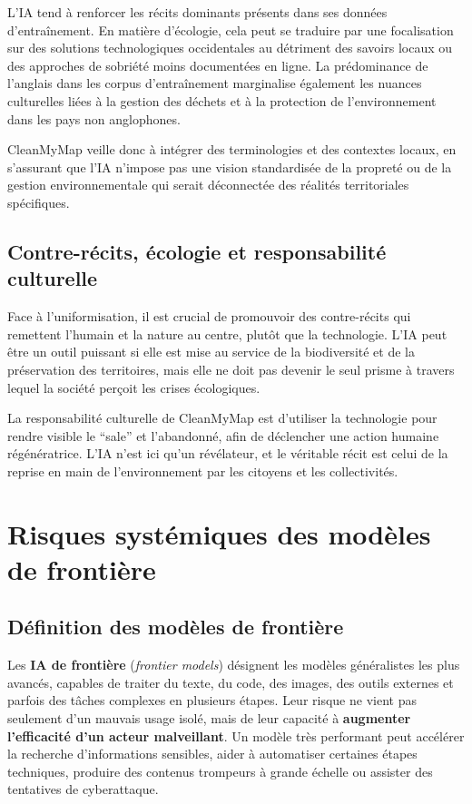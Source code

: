 \documentclass[
  10pt,
  a4paper,
  DIV=11,
  numbers=noendperiod,
  oneside]{scrreprt}
\let\oldtextbf\textbf
\renewcommand{\textbf}[1]{\oldtextbf{\textcolor{cmmnavy}{#1}}}
\let\oldemph\emph
\renewcommand{\emph}[1]{\oldemph{\textcolor{cmmgray}{#1}}}
\begin{document}
L'IA tend à renforcer les récits dominants présents dans ses données
d'entraînement. En matière d'écologie, cela peut se traduire par une
focalisation sur des solutions technologiques occidentales au détriment
des savoirs locaux ou des approches de sobriété moins documentées en
ligne. La prédominance de l'anglais dans les corpus d'entraînement
marginalise également les nuances culturelles liées à la gestion des
déchets et à la protection de l'environnement dans les pays non
anglophones.

CleanMyMap veille donc à intégrer des terminologies et des contextes
locaux, en s'assurant que l'IA n'impose pas une vision standardisée de
la propreté ou de la gestion environnementale qui serait déconnectée des
réalités territoriales spécifiques.

\subsection{Contre-récits, écologie et responsabilité
culturelle}\label{contre-ruxe9cits-uxe9cologie-et-responsabilituxe9-culturelle}

Face à l'uniformisation, il est crucial de promouvoir des contre-récits
qui remettent l'humain et la nature au centre, plutôt que la
technologie. L'IA peut être un outil puissant si elle est mise au
service de la biodiversité et de la préservation des territoires, mais
elle ne doit pas devenir le seul prisme à travers lequel la société
perçoit les crises écologiques.

La responsabilité culturelle de CleanMyMap est d'utiliser la technologie
pour rendre visible le ``sale'' et l'abandonné, afin de déclencher une
action humaine régénératrice. L'IA n'est ici qu'un révélateur, et le
véritable récit est celui de la reprise en main de l'environnement par
les citoyens et les collectivités.

\section{Risques systémiques des modèles de
frontière}\label{risques-systuxe9miques-des-moduxe8les-de-frontiuxe8re}

\subsection{Définition des modèles de
frontière}\label{duxe9finition-des-moduxe8les-de-frontiuxe8re}

Les \textbf{IA de frontière} (\emph{frontier models}) désignent les
modèles généralistes les plus avancés, capables de traiter du texte, du
code, des images, des outils externes et parfois des tâches complexes en
plusieurs étapes. Leur risque ne vient pas seulement d'un mauvais usage
isolé, mais de leur capacité à \textbf{augmenter l'efficacité d'un
acteur malveillant}. Un modèle très performant peut accélérer la
recherche d'informations sensibles, aider à automatiser certaines étapes
techniques, produire des contenus trompeurs à grande échelle ou assister
des tentatives de cyberattaque.
\end{document}
